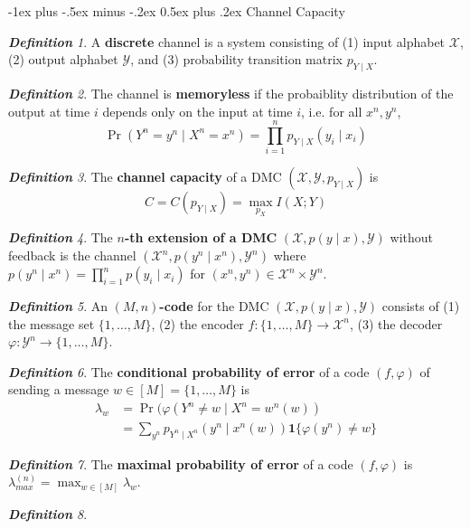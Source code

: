 \documentclass[frenchspacing,9pt,landscape,a4paper]{article}
\makeatletter
\renewcommand{\section}{\@startsection{section}{1}{0mm}%
                                {-1ex plus -.5ex minus -.2ex}%
                                {0.5ex plus .2ex}%
                                {\normalfont\large\bfseries}}
\newcommand{\mb}[1]{\mathbf {#1}}
\DeclareMathOperator{\pr}{Pr}
\theoremstyle{remark}
\newtheorem*{defn}{\textbf{Definition}}
\makeatother
\begin{document}
\begin{multicols}{4}
\section{Channel Capacity}
\begin{defn}
    A \textbf{discrete} channel is a system consisting of (1) input alphabet $\mathcal{X}$, (2) output
    alphabet  $\mathcal{Y}$, and (3) probability transition matrix $p_{Y\mid X}$.
\end{defn}
\begin{defn}
    The channel is \textbf{memoryless} if the probaiblity distribution of the output at time $i$ depends
    only on the input at time  $i$, i.e. for all  $x^n,y^n$,  \[\pr(Y^n=y^n\mid X^n=x^n)=\prod_{i=1}^n
    p_{Y\mid X}(y_i\mid x_i)\]
\end{defn}
\begin{defn}
    The \textbf{channel capacity} of a DMC $(\mathcal{X},\mathcal{Y},p_{Y\mid X})$ is
    \[C=C(p_{Y\mid X})=\max_{p_X} I(X;Y)\]
\end{defn}
\begin{defn}
    The \textbf{$n$-th extension of a DMC} $(\mathcal{X},p(y\mid x),\mathcal{Y})$ without feedback is the
    channel  $(\mathcal{X}^n,p(y^n\mid x^n),\mathcal{Y}^n)$ where $p(y^n\mid x^n)=\prod_{i=1}^n p(y_i\mid
    x_i)$ for  $(x^n,y^n)\in\mathcal{X}^n\times\mathcal{Y}^n$.
\end{defn}
\begin{defn}
    An \textbf{$(M,n)$-code} for the DMC $(\mathcal{X},p(y\mid x),\mathcal{Y})$ consists of (1) the message
    set  $\{1,\dots,M\}$, (2) the encoder  $f:\{1,\dots,M\}\to\mathcal{X}^n$, (3) the decoder
    $\varphi:\mathcal{Y}^n\to\{1,\dots,M\}$.
\end{defn}
\begin{defn}
    The \textbf{conditional probability of error} of a code $(f,\varphi)$ of sending a message
    $w\in[M]=\{1,\dots,M\}$ is
     \begin{align*}
         \lambda_w&=\pr(\varphi(Y^n\neq w\mid X^n=w^n(w))\\
                  &=\sum_{y^n}p_{Y^n\mid X^n}(y^n\mid x^n(w))\mb{1}\{\varphi(y^n)\neq w\}
    \end{align*}
\end{defn}
\begin{defn}
    The \textbf{maximal probability of error} of a code $(f,\varphi)$ is
    $\lambda_{max}^{(n)}=\max_{w\in[M]}\lambda_w$.
\end{defn}
\begin{defn}

\end{defn}
\end{multicols}
\end{document}
